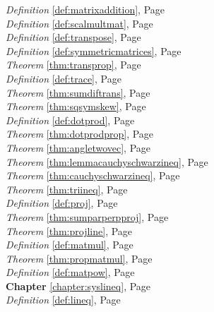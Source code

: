 \begin{multicols}{3}
\begin{center}
      \textit{Definition} \ref{def:matrixaddition}, Page \pageref{def:matrixaddition} \\
      \textit{Definition} \ref{def:scalmultmat}, Page \pageref{def:scalmultmat} \\
      \textit{Definition} \ref{def:transpose}, Page \pageref{def:transpose} \\
      \textit{Definition} \ref{def:symmetricmatrices}, Page \pageref{def:symmetricmatrices} \\
      \textit{Theorem} \ref{thm:transprop}, Page \pageref{thm:transprop} \\
      \textit{Definition} \ref{def:trace}, Page \pageref{def:trace} \\
      \textit{Theorem} \ref{thm:sumdiftrans}, Page \pageref{thm:sumdiftrans} \\
      \textit{Theorem} \ref{thm:sqsymskew}, Page \pageref{thm:sqsymskew} \\
      \textit{Definition} \ref{def:dotprod}, Page \pageref{def:dotprod} \\
      \textit{Theorem} \ref{thm:dotprodprop}, Page \pageref{thm:dotprodprop} \\
      \textit{Theorem} \ref{thm:angletwovec}, Page \pageref{thm:angletwovec} \\
      \textit{Theorem} \ref{thm:lemmacauchyschwarzineq}, Page \pageref{thm:lemmacauchyschwarzineq} \\
      \textit{Theorem} \ref{thm:cauchyschwarzineq}, Page \pageref{thm:cauchyschwarzineq} \\
      \textit{Theorem} \ref{thm:triineq}, Page \pageref{thm:triineq} \\
      \textit{Definition} \ref{def:proj}, Page \pageref{def:proj} \\
      \textit{Theorem} \ref{thm:sumparperpproj}, Page \pageref{thm:sumparperpproj} \\
      \textit{Theorem} \ref{thm:projline}, Page \pageref{thm:projline} \\
      \textit{Definition} \ref{def:matmul}, Page \pageref{def:matmul} \\
      \textit{Theorem} \ref{thm:propmatmul}, Page \pageref{thm:propmatmul} \\
      \textit{Definition} \ref{def:matpow}, Page \pageref{def:matpow} \\
      \textbf{Chapter} \ref{chapter:syslineq}, Page \pageref{chapter:syslineq} \\
      \textit{Definition} \ref{def:lineq}, Page \pageref{def:lineq} \\

\end{center}
\end{multicols}
